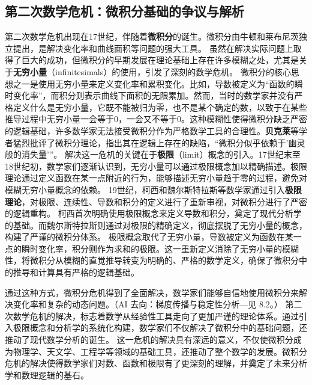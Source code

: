 
\subsection{第二次数学危机：微积分基础的争议与解析}


第二次数学危机出现在17世纪，伴随着{\bf 微积分}的诞生。微积分由牛顿和莱布尼茨独立提出，是解决变化率和曲线面积等问题的强大工具。
虽然在解决实际问题上取得了巨大的成功，但微积分的早期发展在理论基础上存在许多模糊之处，尤其是关于{\bf 无穷小量}（infinitesimals）的使用，引发了深刻的数学危机。
微积分的核心思想之一是使用无穷小量来定义变化率和累积变化。比如，导数被定义为“函数的瞬时变化率”，而积分则表示曲线下面积的无限累加。然而，当时的数学家并没有严格定义什么是无穷小量，它既不能被归为零，也不是某个确定的数，以致于在某些推导过程中无穷小量一会等于0，一会又不等于0。这种模糊性使得微积分缺乏严密的逻辑基础，许多数学家无法接受微积分作为严格数学工具的合理性。{\bf 贝克莱}等学者猛烈批评了微积分理论，指出其在逻辑上存在的缺陷，“微积分似乎依赖于'幽灵般的消失量'”。
解决这一危机的关键在于{\bf 极限}（limit）概念的引入。17世纪末至18世纪初，数学家们逐渐认识到，无穷小量可以通过极限概念加以精确描述。极限理论通过定义函数在某一点附近的行为，能够描述无穷小量趋于零的过程，避免对模糊无穷小量概念的依赖。
19世纪，柯西和魏尔斯特拉斯等数学家通过引入{\bf 极限理论}，对极限、连续性、导数和积分的定义进行了重新审视，对微积分进行了严密的逻辑重构。
柯西首次明确使用极限概念来定义导数和积分，奠定了现代分析学的基础。而魏尔斯特拉斯则通过对极限的精确定义，彻底摆脱了无穷小量的概念，构建了严谨的微积分体系。
极限概念取代了无穷小量，导数被定义为函数在某一点的瞬时变化率，积分则作为求和的极限。这一重新定义消除了无穷小量的模糊性，将微积分从模糊的直觉推导转变为明确的、严格的数学定义，确保了微积分中的推导和计算具有严格的逻辑基础。


通过这种方式，微积分危机得到了全面解决，数学家们能够自信地使用微积分来解决变化率和复杂的动态问题。{（AI 去向：梯度传播与稳定性分析—见 8.2。）}
第二次数学危机的解决，标志着数学从经验性工具走向了更加严谨的理论体系。通过引入极限概念和分析学的系统化构建，数学家们不仅解决了微积分中的基础问题，还推动了现代数学分析的诞生。
这一危机的解决具有深远的意义，不仅使微积分成为物理学、天文学、工程学等领域的基础工具，还推动了整个数学的发展。微积分危机的解决使得数学家们对数、函数和极限有了更深刻的理解，并奠定了未来分析学和数理逻辑的基石。
